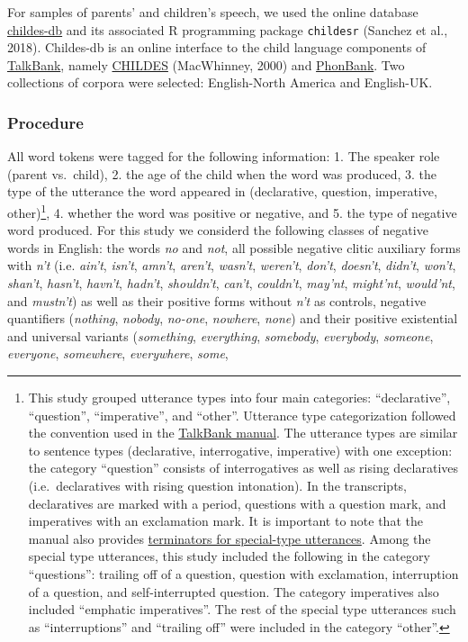\documentclass[man,floatsintext,draftall]{apa6}
\let\rmarkdownfootnote\footnote%
\def\footnote{\protect\rmarkdownfootnote}
\begin{document}
For samples of parents' and children's speech, we used the online database \href{childes-db.stanford.edu}{childes-db} and its associated R programming package \texttt{childesr} (Sanchez et al., 2018). Childes-db is an online interface to the child language components of \href{https://talkbank.org/}{TalkBank}, namely \href{https://childes.talkbank.org/}{CHILDES} (MacWhinney, 2000) and \href{https://phonbank.talkbank.org/}{PhonBank}. Two collections of corpora were selected: English-North America and English-UK.

\hypertarget{procedure}{%
\subsubsection{Procedure}\label{procedure}}

All word tokens were tagged for the following information: 1. The speaker role (parent vs.~child), 2. the age of the child when the word was produced, 3. the type of the utterance the word appeared in (declarative, question, imperative, other)\footnote{This study grouped utterance types into four main categories: \enquote{declarative}, \enquote{question}, \enquote{imperative}, and \enquote{other}. Utterance type categorization followed the convention used in the \href{https://talkbank.org/manuals/CHAT.html\#_Toc486414422}{TalkBank manual}. The utterance types are similar to sentence types (declarative, interrogative, imperative) with one exception: the category \enquote{question} consists of interrogatives as well as rising declaratives (i.e.~declaratives with rising question intonation). In the transcripts, declaratives are marked with a period, questions with a question mark, and imperatives with an exclamation mark. It is important to note that the manual also provides \href{https://talkbank.org/manuals/CHAT.html\#_Toc486414431}{terminators for special-type utterances}. Among the special type utterances, this study included the following in the category \enquote{questions}: trailing off of a question, question with exclamation, interruption of a question, and self-interrupted question. The category imperatives also included \enquote{emphatic imperatives}. The rest of the special type utterances such as \enquote{interruptions} and \enquote{trailing off} were included in the category \enquote{other}.}, 4. whether the word was positive or negative, and 5. the type of negative word produced. For this study we considerd the following classes of negative words in English: the words \emph{no} and \emph{not}, all possible negative clitic auxiliary forms with \emph{n't} (i.e. \emph{ain't}, \emph{isn't}, \emph{amn't}, \emph{aren't}, \emph{wasn't}, \emph{weren't}, \emph{don't}, \emph{doesn't}, \emph{didn't}, \emph{won't}, \emph{shan't}, \emph{hasn't}, \emph{havn't}, \emph{hadn't}, \emph{shouldn't}, \emph{can't}, \emph{couldn't}, \emph{may'nt}, \emph{might'nt}, \emph{would'nt}, and \emph{mustn't}) as well as their positive forms without \emph{n't} as controls, negative quantifiers (\emph{nothing}, \emph{nobody}, \emph{no-one}, \emph{nowhere}, \emph{none}) and their positive existential and universal variants (\emph{something}, \emph{everything}, \emph{somebody}, \emph{everybody}, \emph{someone}, \emph{everyone}, \emph{somewhere}, \emph{everywhere}, \emph{some}, 
\end{document}
